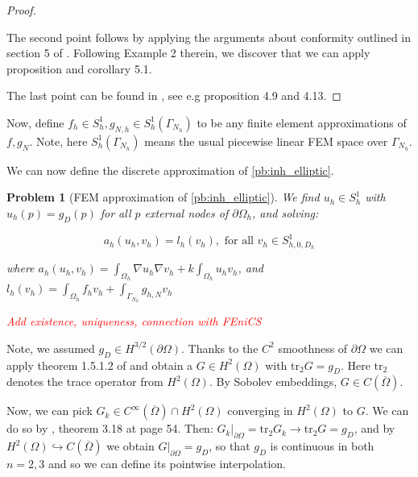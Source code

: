 \documentclass[english,a4paper,9pt,oneside]{scrbook}	%
\theoremstyle{break}
\newtheorem{pb}[equation]{Problem}
\newenvironment{mproof}[1][\proofname]{%
  \begin{proof}[#1]$ $\par\nobreak\ignorespaces
}{%
  \end{proof}
}
\renewcommand*{\proofname}{Proof}
\theoremstyle{remark}
\newcommand{\ds}{\displaystyle}
\newcommand{\tr}{\text{tr}}
\newcommand{\emb}{\hookrightarrow}
\begin{document}
\begin{appendices}
\begin{mproof}
The second point follows by applying the arguments about conformity outlined in section 5 of \cite{bernardi}. Following Example 2 therein, we discover that we can apply proposition and corollary 5.1.

The last point can be found in \cite{elliott}, see e.g proposition 4.9 and 4.13.
%
%
%
%

\end{mproof}

Now, define $f_h \in S^1_h, g_{N,h} \in S^1_h(\Gamma_{N_h})$ to be any finite element approximations of $f, g_N$. Note, here $S^1_h(\Gamma_{N_h})$ means the usual piecewise linear FEM space over  $\Gamma_{N_h}$.

We can now define the discrete approximation of \cref{pb:inh_elliptic}.

\begin{pb}[FEM approximation of \cref{pb:inh_elliptic}]
We find $u_h \in S^1_h$ with $u_h(p)=g_D(p)$ for all $p$ external nodes of $\partial \Omega_h$, and solving:

$$a_h(u_h,v_h) = l_h(v_h), \text{ for all } v_h \in S^1_{h,0,D_h}$$

where $a_h(u_h,v_h) =\ds \int_{\Omega_h}\nabla u_h \nabla v_h + k \int_{\Omega_h} u_h  v_h$, and $l_h(v_h) =\ds \int_{\Omega_h}f_h v_h + \int_{\Gamma_{N_h}} g_{h,N}v_h$


\textcolor{red}{Add existence, uniqueness, connection with FEniCS}

\end{pb}

Note, we assumed $g_D \in H^{3/2}(\partial \Omega)$. Thanks to the $C^2$ smoothness of $\partial \Omega$ we can apply theorem 1.5.1.2 of \cite{grisvard} and obtain a $G \in H^2(\Omega)$ with $\tr_2 G = g_D$. Here $\tr_2$ denotes the trace operator from $H^2(\Omega)$. By Sobolev embeddings, $G \in C(\overline{\Omega})$. 

Now, we can pick $G_k \in C^\infty(\overline{\Omega})\cap H^2(\Omega)$ converging in $H^2(\Omega)$ to $G$. We can do so by \cite{adams}, theorem 3.18 at page 54. Then: $G_k|_{\partial \Omega}= \tr_2 G_k \rightarrow \tr_2 G = g_D$, and by $H^2(\Omega)\emb C(\overline{\Omega})$ we obtain $G|_{\partial \Omega} = g_D$, so that $g_D$ is continuous in both $n=2,3$ and so we can define its pointwise interpolation.


\end{appendices}
\end{document}
